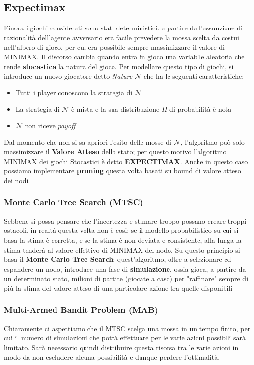\subsection{Expectimax}
Finora i giochi considerati sono stati deterministici: a partire dall'assunzione di razionalità dell'agente avversario era 
facile prevedere la mossa scelta da costui nell'albero di gioco, per cui era possibile sempre massimizzare il valore di MINIMAX.
Il discorso cambia quando entra in gioco una variabile aleatoria che rende \textbf{stocastica} la natura del gioco. Per modellare
questo tipo di giochi, si introduce un nuovo giocatore detto \textit{Nature} $\mathcal{N}$ che ha le seguenti caratteristiche:
\begin{itemize}
    \item Tutti i player conoscono la strategia di $\mathcal{N}$
    \item La strategia di $\mathcal{N}$ è mista e la sua distribuzione $\Pi$ di probabilità è nota
    \item $\mathcal{N}$ non riceve \textit{payoff}
\end{itemize}
Dal momento che non si sa apriori l'esito delle mosse di $\mathcal{N}$, l'algoritmo può solo massimizzare il \textbf{Valore Atteso}
dello stato; per questo motivo l'algoritmo MINIMAX dei giochi Stocastici è detto \textbf{EXPECTIMAX}.
Anche in questo caso possiamo implementare \textbf{pruning} questa volta basati su bound di valore atteso dei nodi.

\subsubsection{Monte Carlo Tree Search (MTSC)}
Sebbene si possa pensare che l'incertezza e stimare troppo possano creare troppi ostacoli, in realtà questa volta non è cosi:
se il modello probabilistico su cui si basa la stima è corretta, e se la stima è non deviata e consistente, alla lunga la stima
tenderà al valore effettivo di MINIMAX del nodo.
Su questo principio si basa il \textbf{Monte Carlo Tree Search}: quest'algoritmo, oltre a selezionare ed espandere un nodo, introduce
una fase di \textbf{simulazione}, ossia gioca, a partire da un determinato stato, milioni di partite (giocate a caso) per "raffinare" sempre di più la stima 
del valore atteso di una particolare azione tra quelle disponibili

\subsubsection{Multi-Armed Bandit Problem (MAB)}
Chiaramente ci aspettiamo che il MTSC scelga una mossa in un tempo finito, per cui il numero di simulazioni che potrà effettuare
per le varie azioni possibili sarà limitato. Sarà necessario quindi distribuire questa risorsa tra le varie azioni
in modo da non escludere alcuna possibilità e dunque perdere l'ottimalità. 
